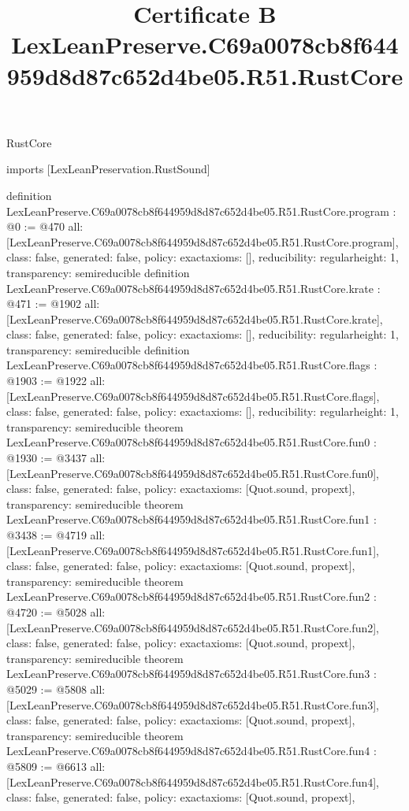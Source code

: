\begin{lexlean}{RustCore}
\title{Certificate B LexLeanPreserve.C69a0078cb8f644959d8d87c652d4be05.R51.RustCore}
\begin{coremodule}
imports [LexLeanPreservation.RustSound]

definition LexLeanPreserve.C69a0078cb8f644959d8d87c652d4be05.R51.RustCore.program : @0 := @470 {
  all: [LexLeanPreserve.C69a0078cb8f644959d8d87c652d4be05.R51.RustCore.program],
  class: false,
  generated: false,
  policy: exact{axioms: []},
  reducibility: regular{height: 1},
  transparency: semireducible
}
definition LexLeanPreserve.C69a0078cb8f644959d8d87c652d4be05.R51.RustCore.krate : @471 := @1902 {
  all: [LexLeanPreserve.C69a0078cb8f644959d8d87c652d4be05.R51.RustCore.krate],
  class: false,
  generated: false,
  policy: exact{axioms: []},
  reducibility: regular{height: 1},
  transparency: semireducible
}
definition LexLeanPreserve.C69a0078cb8f644959d8d87c652d4be05.R51.RustCore.flags : @1903 := @1922 {
  all: [LexLeanPreserve.C69a0078cb8f644959d8d87c652d4be05.R51.RustCore.flags],
  class: false,
  generated: false,
  policy: exact{axioms: []},
  reducibility: regular{height: 1},
  transparency: semireducible
}
theorem LexLeanPreserve.C69a0078cb8f644959d8d87c652d4be05.R51.RustCore.fun0 : @1930 := @3437 {
  all: [LexLeanPreserve.C69a0078cb8f644959d8d87c652d4be05.R51.RustCore.fun0],
  class: false,
  generated: false,
  policy: exact{axioms: [Quot.sound, propext]},
  transparency: semireducible
}
theorem LexLeanPreserve.C69a0078cb8f644959d8d87c652d4be05.R51.RustCore.fun1 : @3438 := @4719 {
  all: [LexLeanPreserve.C69a0078cb8f644959d8d87c652d4be05.R51.RustCore.fun1],
  class: false,
  generated: false,
  policy: exact{axioms: [Quot.sound, propext]},
  transparency: semireducible
}
theorem LexLeanPreserve.C69a0078cb8f644959d8d87c652d4be05.R51.RustCore.fun2 : @4720 := @5028 {
  all: [LexLeanPreserve.C69a0078cb8f644959d8d87c652d4be05.R51.RustCore.fun2],
  class: false,
  generated: false,
  policy: exact{axioms: [Quot.sound, propext]},
  transparency: semireducible
}
theorem LexLeanPreserve.C69a0078cb8f644959d8d87c652d4be05.R51.RustCore.fun3 : @5029 := @5808 {
  all: [LexLeanPreserve.C69a0078cb8f644959d8d87c652d4be05.R51.RustCore.fun3],
  class: false,
  generated: false,
  policy: exact{axioms: [Quot.sound, propext]},
  transparency: semireducible
}
theorem LexLeanPreserve.C69a0078cb8f644959d8d87c652d4be05.R51.RustCore.fun4 : @5809 := @6613 {
  all: [LexLeanPreserve.C69a0078cb8f644959d8d87c652d4be05.R51.RustCore.fun4],
  class: false,
  generated: false,
  policy: exact{axioms: [Quot.sound, propext]},
}
\end{coremodule}
\end{lexlean}
